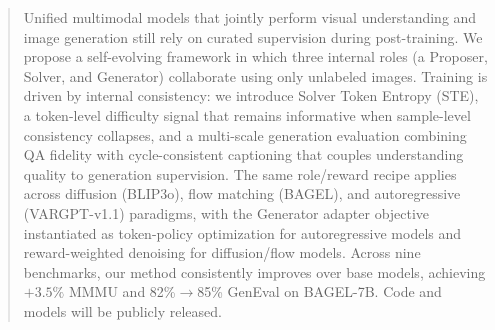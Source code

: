 \begin{abstract}
    Unified multimodal models that jointly perform visual understanding and image generation still rely on curated supervision during post-training. We propose a self-evolving framework in which three internal roles (a Proposer, Solver, and Generator) collaborate using only unlabeled images. Training is driven by internal consistency: we introduce Solver Token Entropy (STE), a token-level difficulty signal that remains informative when sample-level consistency collapses, and a multi-scale generation evaluation combining QA fidelity with cycle-consistent captioning that couples understanding quality to generation supervision. The same role/reward recipe applies across diffusion (BLIP3o), flow matching (BAGEL), and autoregressive (VARGPT-v1.1) paradigms, with the Generator adapter objective instantiated as token-policy optimization for autoregressive models and reward-weighted denoising for diffusion/flow models. Across nine benchmarks, our method consistently improves over base models, achieving $+3.5\%$ MMMU and 82\%$\to$85\% GenEval on BAGEL-7B. Code and models will be publicly released.
\end{abstract}
